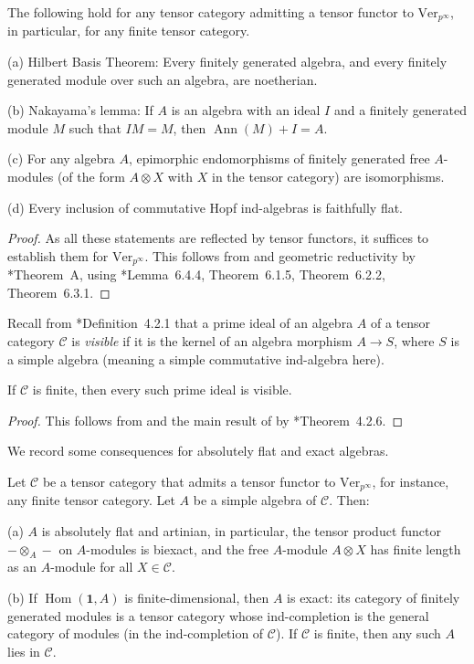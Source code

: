 \documentclass[11pt,oneside]{amsart}
\theoremstyle{definition}
\theoremstyle{remark}
\numberwithin{equation}{section}
\newcommand\cC{\mathcal C}
\newcommand\Ver{\mathrm{Ver}}
\renewcommand\o\otimes
\renewcommand\:\colon
\newcommand\one{\mathbf{1}}
\newcommand\Hom{\operatorname{Hom}}
\begin{document}
\newcommand\Ann{\operatorname{Ann}}

\begin{proposition} The following hold for any tensor category admitting a tensor functor to $\Ver_{p^\infty}$, in particular, for any finite tensor category.

(a) Hilbert Basis Theorem: Every finitely generated algebra, and every finitely generated module over such an algebra, are noetherian.

(b) Nakayama's lemma: If $A$ is an algebra with an ideal $I$ and a finitely generated module $M$ such that $IM=M$, then $\Ann(M)+I=A$.

(c) For any algebra $A$, epimorphic endomorphisms of finitely generated free $A$-modules (of the form $A\o X$ with $X$ in the tensor category) are isomorphisms.

(d) Every inclusion of commutative Hopf ind-algebras is faithfully flat. 
\end{proposition}

\begin{proof} As all these statements are reflected by tensor functors, it suffices to establish them for $\Ver_{p^\infty}$. This follows from  and geometric reductivity by \cite{Cou-gr}*{Theorem~A}, using \cite{Cou-commalg}*{Lemma~6.4.4, Theorem~6.1.5, Theorem~6.2.2, Theorem~6.3.1}.
\end{proof}


Recall from \cite{Cou-commalg}*{Definition~4.2.1} that a prime ideal of an algebra $A$ of a tensor category $\cC$ is \emph{visible} if it is the kernel of an algebra morphism $A\to S$, where $S$ is a simple algebra (meaning a simple commutative ind-algebra here).

\begin{proposition} If $\cC$ is finite, then every such prime ideal is visible. 
\end{proposition}

\begin{proof} This follows from  and the main result of \cite{CF-beo} by \cite{Cou-commalg}*{Theorem~4.2.6}.
\end{proof}


We record some consequences for absolutely flat and exact algebras.

\begin{proposition} Let $\cC$ be a tensor category that admits a tensor functor to $\Ver_{p^\infty}$, for instance, any finite tensor category. Let $A$ be a simple algebra of $\cC$. Then:

(a) $A$ is absolutely flat and artinian, in particular, the tensor product functor $-\o_A-$ on $A$-modules is biexact, and the free $A$-module $A\o X$ has finite length as an $A$-module for all $X\in\cC$.

(b) If $\Hom(\one,A)$ is finite-dimensional, then $A$ is exact: its category of finitely generated modules is a tensor category whose ind-completion is the general category of modules (in the ind-completion of $\cC$). If $\cC$ is finite, then any such $A$ lies in $\cC$.
\end{proposition}
\end{document}
